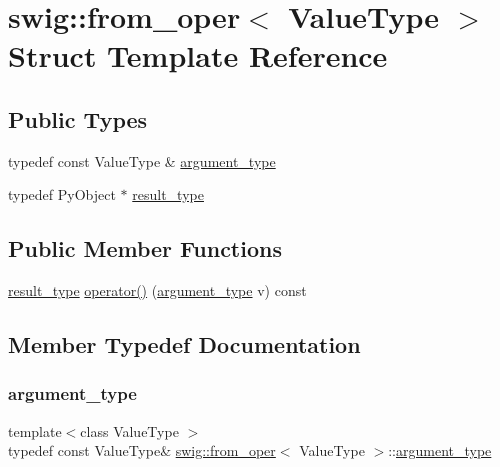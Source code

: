 \hypertarget{structswig_1_1from__oper}{}\section{swig\+:\+:from\+\_\+oper$<$ Value\+Type $>$ Struct Template Reference}
\label{structswig_1_1from__oper}
\subsection*{Public Types}
\begin{DoxyCompactItemize}
\item 
typedef const Value\+Type \& \hyperlink{structswig_1_1from__oper_a33151174816bb2d002b7b504bcfc1902}{argument\+\_\+type}
\item 
typedef Py\+Object $\ast$ \hyperlink{structswig_1_1from__oper_aceed5a894a65b69078106cda841f6021}{result\+\_\+type}
\end{DoxyCompactItemize}
\subsection*{Public Member Functions}
\begin{DoxyCompactItemize}
\item 
\hyperlink{structswig_1_1from__oper_aceed5a894a65b69078106cda841f6021}{result\+\_\+type} \hyperlink{structswig_1_1from__oper_a8c92f4feba24d5a1ee72e2fc25b38ce3}{operator()} (\hyperlink{structswig_1_1from__oper_a33151174816bb2d002b7b504bcfc1902}{argument\+\_\+type} v) const
\end{DoxyCompactItemize}


\subsection{Member Typedef Documentation}
\mbox{\label{structswig_1_1from__oper_a33151174816bb2d002b7b504bcfc1902}} 
\subsubsection{\texorpdfstring{argument\+\_\+type}{argument\_type}}
{\footnotesize\ttfamily template$<$class Value\+Type $>$ \\
typedef const Value\+Type\& \hyperlink{structswig_1_1from__oper}{swig\+::from\+\_\+oper}$<$ Value\+Type $>$\+::\hyperlink{structswig_1_1from__oper_a33151174816bb2d002b7b504bcfc1902}{argument\+\_\+type}}

